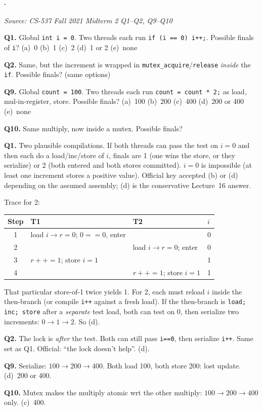 \documentclass[11pt,a4paper]{article}
\makeatletter
\newcommand{\keepspace}[1]{\par\penalty-100\begingroup
  \setlength{\dimen@}{#1}\dimen@ii\pagegoal\advance\dimen@ii-\pagetotal
  \ifdim\dimen@>\dimen@ii\ifdim\dimen@ii>\z@\vfil\fi\break\fi\endgroup}
\newcounter{qn}[section]
\newenvironment{Qn}[4]{%
  \refstepcounter{qn}\keepspace{7\baselineskip}%
  \begin{tcolorbox}[qboxstyle, title={Q\thesection.\theqn\ \ [#1 \textbar\ #2]\ \ #4}]%
  {\footnotesize\color{g3}\textit{Source: #3}}\par\smallskip%
}{%
  \end{tcolorbox}%
}
\newenvironment{Sol}{%
  \begin{tcolorbox}[sboxstyle, title={Solution}]%
}{%
  \end{tcolorbox}\vspace{0.35em}%
}
\makeatother
\begin{document}
\begin{Qn}{Hard}{Lect 16}{CS-537 Fall 2021 Midterm 2 Q1--Q2, Q9--Q10}{Check-then-act and racy multiply}
\textbf{Q1.} Global \texttt{int i = 0}. Two threads each run \texttt{if (i == 0) i++;}. Possible finals of \texttt{i}?
(a)~0 (b)~1 (c)~2 (d)~1 or 2 (e)~none

\textbf{Q2.} Same, but the increment is wrapped in \texttt{mutex\_acquire}/\texttt{release} \emph{inside} the \texttt{if}. Possible finals?
(same options)

\textbf{Q9.} Global \texttt{count = 100}. Two threads each run \texttt{count = count * 2;} as load, mul-in-register, store. Possible finals?
(a)~100 (b)~200 (c)~400 (d)~200 or 400 (e)~none

\textbf{Q10.} Same multiply, now inside a mutex. Possible finals?
\end{Qn}
\begin{Sol}
\textbf{Q1.} Two plausible compilations. If both threads can pass the test on $i=0$ and then each do a load/inc/store of $i$, finals are 1 (one wins the store, or they serialize) or 2 (both entered and both stores committed). $i=0$ is impossible (at least one increment stores a positive value). Official key accepted (b) or (d) depending on the assumed assembly; (d) is the conservative Lecture~16 answer.

Trace for 2:
\begin{center}
\begin{tabular}{c|l|l|l}
Step & T1 & T2 & $i$ \\
\hline
1 & load $i\to r=0$; $0==0$, enter & & 0 \\
2 & & load $i\to r=0$; enter & 0 \\
3 & $r{+}{+}{=}1$; store $i=1$ & & 1 \\
4 & & $r{+}{+}{=}1$; store $i=1$ & 1 \\
\end{tabular}
\end{center}
That particular store-of-1 twice yields 1. For 2, each must reload $i$ inside the then-branch (or compile \texttt{i++} against a fresh load). If the then-branch is \texttt{load; inc; store} after a \emph{separate} test load, both can test on 0, then serialize two increments: $0\to1\to2$. So (d).

\textbf{Q2.} The lock is \emph{after} the test. Both can still pass \texttt{i==0}, then serialize \texttt{i++}. Same set as Q1. Official: ``the lock doesn't help''. (d).

\textbf{Q9.} Serialize: $100\to200\to400$. Both load 100, both store 200: lost update. (d)~200 or 400.

\textbf{Q10.} Mutex makes the multiply atomic wrt the other multiply: $100\to200\to400$ only. (c)~400.
\end{Sol}
\end{document}

